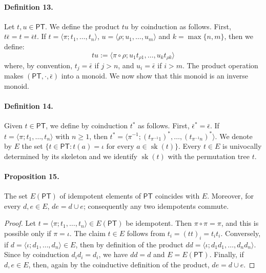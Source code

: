 \documentclass[10pt,a4paper]{amsart}
\begin{document}
\paragraph{Definition 13.} Let $t,u\in\mathsf{PT}$. We define the product $tu$ by coinduction as follows. First, $t\bar\epsilon=t=\bar\epsilon t$.
If $t=\langle\pi;t_1,\ldots,t_n\rangle$, $u=\langle\rho;u_1,\ldots,u_m\rangle$ and $k=\max\{n,m\}$, then we define:
\[
tu:=\langle\pi\circ\rho;u_1t_{\rho1},\ldots,u_kt_{\rho k}\rangle
\]
where, by convention, $t_j=\bar\epsilon$ if $j>n$, and $u_i=\bar\epsilon$ if $i>m$.
The product operation makes $(\mathsf{PT},\cdot,\bar\epsilon)$ into a monoid. We now show that this monoid is an inverse monoid.
\paragraph{Definition 14.} Given $t\in\mathsf{PT}$, we define by coinduction $t^*$ as follows. First, $\bar\epsilon^*=\bar\epsilon$.
If $t=\langle\pi;t_1,\ldots,t_n\rangle$ with $n\ge1$, then $t^*=\langle\pi^{-1};(t_{\pi^{-1}1})^*,\ldots,(t_{\pi^{-1}n})^*\rangle$.
We denote by $E$ the set $\{t\in\mathsf{PT}:t(a)=\iota\text{ for every }a\in\operatorname{sk}(t)\}$.
Every $t\in E$ is univocally determined by its skeleton and we identify $\operatorname{sk}(t)$ with the permutation tree $t$.
\paragraph{Proposition 15.} The set $E(\mathsf{PT})$ of idempotent elements of $\mathsf{PT}$ coincides with $E$. Moreover, for every $d,e\in E$, $de=d\cup e$; consequently any two idempotents commute.
\begin{proof}
Let $t=\langle\pi;t_1,\ldots,t_n\rangle\in E(\mathsf{PT})$ be idempotent. Then $\pi\circ\pi=\pi$, and this is possible only if $\pi=\iota$.
The claim $t\in E$ follows from $t_i=(tt)_i=t_it_i$.
Conversely, if $d=\langle\iota;d_1,\ldots,d_n\rangle\in E$, then by definition of the product $dd=\langle\iota;d_1d_1,\ldots,d_nd_n\rangle$.
Since by coinduction $d_id_i=d_i$, we have $dd=d$ and $E=E(\mathsf{PT})$.
Finally, if $d,e\in E$, then, again by the coinductive definition of the product, $de=d\cup e$.
\end{proof}
\end{document}
